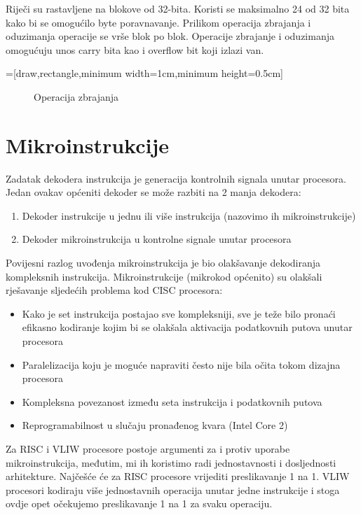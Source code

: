 \documentclass[a4paper]{article}
\begin{document}
  Riječi su rastavljene na blokove od 32-bita. Koristi se maksimalno
  24 od 32 bita kako bi se omogućilo byte poravnavanje. Prilikom
  operacija zbrajanja i oduzimanja operacije se vrše blok po blok.
  Operacije zbrajanje i oduzimanja omogućuju unos carry bita kao
  i overflow bit koji izlazi van.

  =[draw,rectangle,minimum width=1cm,minimum height=0.5cm]

  \begin{figure}

    \caption{Operacija zbrajanja}
  \end{figure}

  \section{Mikroinstrukcije}
  Zadatak dekodera instrukcija je generacija kontrolnih signala unutar
  procesora. Jedan ovakav općeniti dekoder se može razbiti na 2 manja
  dekodera:
  \begin{enumerate}
    \item Dekoder instrukcije u jednu ili više instrukcija (nazovimo
      ih mikroinstrukcije)
    \item Dekoder mikroinstrukcija u kontrolne signale unutar procesora
  \end{enumerate}

  Povijesni razlog uvođenja mikroinstrukcija je bio olakšavanje
  dekodiranja kompleksnih instrukcija. Mikroinstrukcije (mikrokod
  općenito) su olakšali rješavanje sljedećih problema kod CISC
  procesora:
  \begin{itemize}
    \item Kako je set instrukcija postajao sve kompleksniji, sve je
      teže bilo pronaći efikasno kodiranje kojim bi se olakšala
      aktivacija podatkovnih putova unutar procesora
    \item Paralelizacija koju je moguće napraviti često nije bila
      očita tokom dizajna procesora
    \item Kompleksna povezanost između seta instrukcija i podatkovnih
      putova
    \item Reprogramabilnost u slučaju pronađenog kvara (Intel Core 2)
  \end{itemize}

  Za RISC i VLIW procesore postoje argumenti za i protiv uporabe
  mikroinstrukcija, međutim, mi ih koristimo radi jednostavnosti i
  dosljednosti arhitekture.  Najčešće će za RISC procesore vrijediti
  preslikavanje 1 na 1. VLIW procesori kodiraju više jednostavnih
  operacija unutar jedne instrukcije i stoga ovdje opet očekujemo
  preslikavanje 1 na 1 za svaku operaciju.
\end{document}
